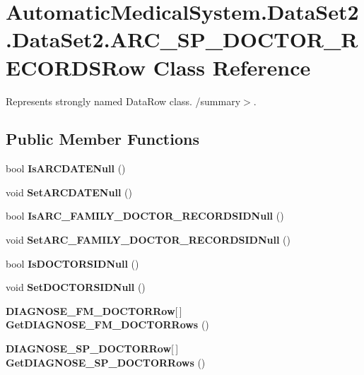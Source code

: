\section{AutomaticMedicalSystem.DataSet2.DataSet2.ARC\_\-SP\_\-DOCTOR\_\-RECORDSRow Class Reference}
\label{class_automatic_medical_system_1_1_data_set2_1_1_a_r_c___s_p___d_o_c_t_o_r___r_e_c_o_r_d_s_row}
Represents strongly named DataRow class. /summary$>$.  


\subsection*{Public Member Functions}
\begin{CompactItemize}
\item 
bool \textbf{IsARCDATENull} ()\label{class_automatic_medical_system_1_1_data_set2_1_1_a_r_c___s_p___d_o_c_t_o_r___r_e_c_o_r_d_s_row_0b9308bcbead6a5b7388ad650eae7d57}

\item 
void \textbf{SetARCDATENull} ()\label{class_automatic_medical_system_1_1_data_set2_1_1_a_r_c___s_p___d_o_c_t_o_r___r_e_c_o_r_d_s_row_4547c22197220e12f6b93e4143394c66}

\item 
bool \textbf{IsARC\_\-FAMILY\_\-DOCTOR\_\-RECORDSIDNull} ()\label{class_automatic_medical_system_1_1_data_set2_1_1_a_r_c___s_p___d_o_c_t_o_r___r_e_c_o_r_d_s_row_1b07cc53d62d7f83093574cc3de9a8cf}

\item 
void \textbf{SetARC\_\-FAMILY\_\-DOCTOR\_\-RECORDSIDNull} ()\label{class_automatic_medical_system_1_1_data_set2_1_1_a_r_c___s_p___d_o_c_t_o_r___r_e_c_o_r_d_s_row_5d6b383a8e66a4d889c1af8517152367}

\item 
bool \textbf{IsDOCTORSIDNull} ()\label{class_automatic_medical_system_1_1_data_set2_1_1_a_r_c___s_p___d_o_c_t_o_r___r_e_c_o_r_d_s_row_3d6a04408ee3f59e3ce9c62075eb4770}

\item 
void \textbf{SetDOCTORSIDNull} ()\label{class_automatic_medical_system_1_1_data_set2_1_1_a_r_c___s_p___d_o_c_t_o_r___r_e_c_o_r_d_s_row_9762b08f9b8f6297c4a08976daa90a2b}

\item 
{\bf DIAGNOSE\_\-FM\_\-DOCTORRow}[$\,$] \textbf{GetDIAGNOSE\_\-FM\_\-DOCTORRows} ()\label{class_automatic_medical_system_1_1_data_set2_1_1_a_r_c___s_p___d_o_c_t_o_r___r_e_c_o_r_d_s_row_776f4b123b47867ca600fab86faa34f8}

\item 
{\bf DIAGNOSE\_\-SP\_\-DOCTORRow}[$\,$] \textbf{GetDIAGNOSE\_\-SP\_\-DOCTORRows} ()\label{class_automatic_medical_system_1_1_data_set2_1_1_a_r_c___s_p___d_o_c_t_o_r___r_e_c_o_r_d_s_row_f72cee3bd9ffb6deace58b81a9b6e07d}

\end{CompactItemize}
